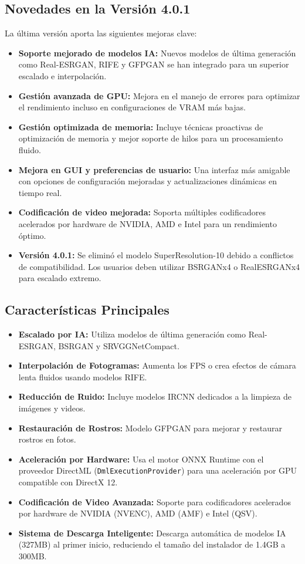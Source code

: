 \documentclass[11pt, a4paper]{article}
\begin{document}
\subsection{Novedades en la Versión 4.0.1}
La última versión aporta las siguientes mejoras clave:
\begin{itemize}[leftmargin=*]
    \item \textbf{Soporte mejorado de modelos IA:} Nuevos modelos de última generación como Real-ESRGAN, RIFE y GFPGAN se han integrado para un superior escalado e interpolación.
    \item \textbf{Gestión avanzada de GPU:} Mejora en el manejo de errores para optimizar el rendimiento incluso en configuraciones de VRAM más bajas.
    \item \textbf{Gestión optimizada de memoria:} Incluye técnicas proactivas de optimización de memoria y mejor soporte de hilos para un procesamiento fluido.
    \item \textbf{Mejora en GUI y preferencias de usuario:} Una interfaz más amigable con opciones de configuración mejoradas y actualizaciones dinámicas en tiempo real.
    \item \textbf{Codificación de video mejorada:} Soporta múltiples codificadores acelerados por hardware de NVIDIA, AMD e Intel para un rendimiento óptimo.
    \item \textbf{Versión 4.0.1:} Se eliminó el modelo SuperResolution-10 debido a conflictos de compatibilidad. Los usuarios deben utilizar BSRGANx4 o RealESRGANx4 para escalado extremo.
\end{itemize}

\subsection{Características Principales}
\begin{itemize}[leftmargin=*]
    \item \textbf{Escalado por IA:} Utiliza modelos de última generación como Real-ESRGAN, BSRGAN y SRVGGNetCompact.
    \item \textbf{Interpolación de Fotogramas:} Aumenta los FPS o crea efectos de cámara lenta fluidos usando modelos RIFE.
    \item \textbf{Reducción de Ruido:} Incluye modelos IRCNN dedicados a la limpieza de imágenes y videos.
    \item \textbf{Restauración de Rostros:} Modelo GFPGAN para mejorar y restaurar rostros en fotos.
    \item \textbf{Aceleración por Hardware:} Usa el motor ONNX Runtime con el proveedor DirectML (\texttt{DmlExecutionProvider}) para una aceleración por GPU compatible con DirectX 12.
    \item \textbf{Codificación de Video Avanzada:} Soporte para codificadores acelerados por hardware de NVIDIA (NVENC), AMD (AMF) e Intel (QSV).
    \item \textbf{Sistema de Descarga Inteligente:} Descarga automática de modelos IA (327MB) al primer inicio, reduciendo el tamaño del instalador de 1.4GB a 300MB.
\end{itemize}
\end{document}
